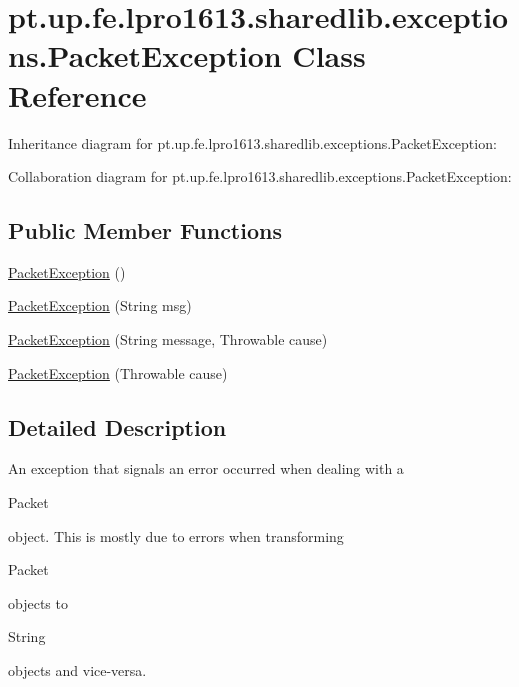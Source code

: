 \hypertarget{classpt_1_1up_1_1fe_1_1lpro1613_1_1sharedlib_1_1exceptions_1_1_packet_exception}{}\section{pt.\+up.\+fe.\+lpro1613.\+sharedlib.\+exceptions.\+Packet\+Exception Class Reference}
\label{classpt_1_1up_1_1fe_1_1lpro1613_1_1sharedlib_1_1exceptions_1_1_packet_exception}


Inheritance diagram for pt.\+up.\+fe.\+lpro1613.\+sharedlib.\+exceptions.\+Packet\+Exception\+:


Collaboration diagram for pt.\+up.\+fe.\+lpro1613.\+sharedlib.\+exceptions.\+Packet\+Exception\+:
\subsection*{Public Member Functions}
\begin{DoxyCompactItemize}
\item 
\hyperlink{classpt_1_1up_1_1fe_1_1lpro1613_1_1sharedlib_1_1exceptions_1_1_packet_exception_ad33ebb985e775f252fff77d7d859ac58}{Packet\+Exception} ()
\item 
\hyperlink{classpt_1_1up_1_1fe_1_1lpro1613_1_1sharedlib_1_1exceptions_1_1_packet_exception_a8710c289a2dd416a1ad7d25248021f9d}{Packet\+Exception} (String msg)
\item 
\hyperlink{classpt_1_1up_1_1fe_1_1lpro1613_1_1sharedlib_1_1exceptions_1_1_packet_exception_aabf4cbacec06473f617c9b8d23829640}{Packet\+Exception} (String message, Throwable cause)
\item 
\hyperlink{classpt_1_1up_1_1fe_1_1lpro1613_1_1sharedlib_1_1exceptions_1_1_packet_exception_ad29eb9640b76bd84e41d523a135b9d88}{Packet\+Exception} (Throwable cause)
\end{DoxyCompactItemize}


\subsection{Detailed Description}
An exception that signals an error occurred when dealing with a 
\begin{DoxyCode}
Packet 
\end{DoxyCode}
 object. This is mostly due to errors when transforming 
\begin{DoxyCode}
Packet 
\end{DoxyCode}
 objects to
\begin{DoxyCode}
String 
\end{DoxyCode}
 objects and vice-\/versa.

